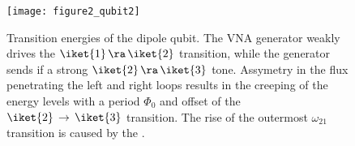  \begin{figure}[h!]
 	\texttt{[image: figure2\_qubit2]}	
 	\caption{Transition energies of the dipole qubit. The VNA generator weakly drives the $ \iket{1}\,\ra\,\iket{2} $ transition, while the generator sends if a strong $ \iket{2}\,\ra\,\iket{3} $ tone. Assymetry in the flux penetrating the left and right loops results in the creeping of the energy levels with a period $ \Phi_0 $ and offset of the $ \iket{2}\,\rightarrow\,\iket{3} $ transition. The rise of the outermost $ \omega_{21} $ transition is caused by the . \label{fig:experiment}
 	}%
 \end{figure}
